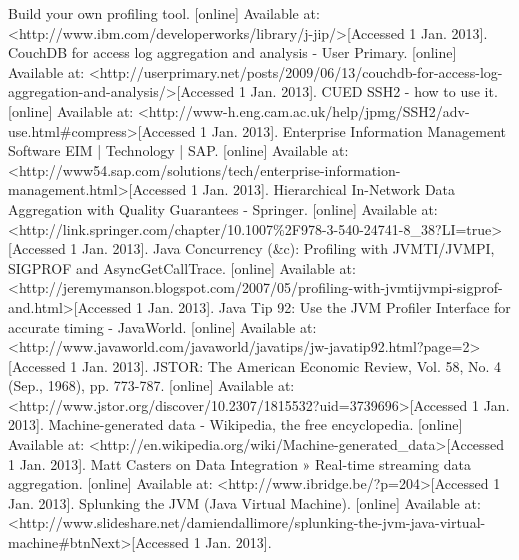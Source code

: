 \documentclass{llncs}
\begin{document}
\begin{thebibliography}{}  %
Build your own profiling tool. [online] Available at: \textless http://www.ibm.com/developerworks/library/j-jip/\textgreater [Accessed 1 Jan. 2013].
CouchDB for access log aggregation and analysis - User Primary. [online] Available at: \textless http://userprimary.net/posts/2009/06/13/couchdb-for-access-log-aggregation-and-analysis/\textgreater [Accessed 1 Jan. 2013].
CUED SSH2 - how to use it. [online] Available at: \textless http://www-h.eng.cam.ac.uk/help/jpmg/SSH2/adv-use.html\#compress\textgreater [Accessed 1 Jan. 2013].
Enterprise Information Management Software EIM | Technology | SAP. [online] Available at: \textless http://www54.sap.com/solutions/tech/enterprise-information-management.html\textgreater [Accessed 1 Jan. 2013].
Hierarchical In-Network Data Aggregation with Quality Guarantees - Springer. [online] Available at: \textless http://link.springer.com/chapter/10.1007\%2F978-3-540-24741-8\_38?LI=true\textgreater [Accessed 1 Jan. 2013].
Java Concurrency (\&c): Profiling with JVMTI/JVMPI, SIGPROF and AsyncGetCallTrace. [online] Available at: \textless http://jeremymanson.blogspot.com/2007/05/profiling-with-jvmtijvmpi-sigprof-and.html\textgreater [Accessed 1 Jan. 2013].
 Java Tip 92: Use the JVM Profiler Interface for accurate timing - JavaWorld. [online] Available at: \textless http://www.javaworld.com/javaworld/javatips/jw-javatip92.html?page=2\textgreater [Accessed 1 Jan. 2013].
JSTOR: The American Economic Review, Vol. 58, No. 4 (Sep., 1968), pp. 773-787. [online] Available at: \textless http://www.jstor.org/discover/10.2307/1815532?uid=3739696\textgreater [Accessed 1 Jan. 2013].
Machine-generated data - Wikipedia, the free encyclopedia. [online] Available at: \textless http://en.wikipedia.org/wiki/Machine-generated\_data\textgreater [Accessed 1 Jan. 2013].
 Matt Casters on Data Integration » Real-time streaming data aggregation. [online] Available at:
\textless http://www.ibridge.be/?p=204\textgreater [Accessed 1 Jan. 2013].
Splunking the JVM (Java Virtual Machine). [online] Available at: \textless http://www.slideshare.net/damiendallimore/splunking-the-jvm-java-virtual-machine\#btnNext\textgreater [Accessed 1 Jan. 2013].

\end{thebibliography}
\end{document}
